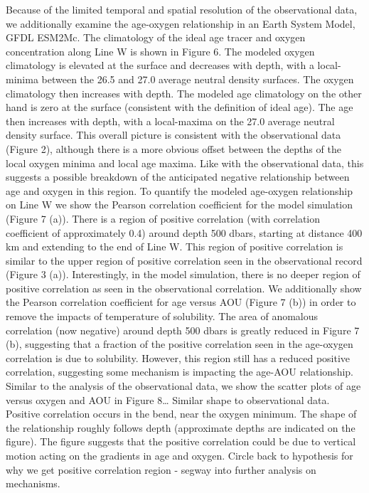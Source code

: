 Because of the limited temporal and spatial resolution of the observational data, we additionally examine the age-oxygen relationship in an Earth System Model, GFDL ESM2Mc. The climatology of the ideal age tracer and oxygen concentration along Line W is shown in Figure 6. The modeled oxygen climatology is elevated at the surface and decreases with depth, with a local-minima between the 26.5 and 27.0 average neutral density surfaces. The oxygen climatology then increases with depth. The modeled age climatology on the other hand is zero at the surface (consistent with the definition of ideal age). The age then increases with depth, with a local-maxima on the 27.0 average neutral density surface. This overall picture is consistent with the observational data (Figure 2), although there is a more obvious offset between the depths of the local oxygen minima and local age maxima. Like with the observational data, this suggests a possible breakdown of the anticipated negative relationship between age and oxygen in this region.
	To quantify the modeled age-oxygen relationship on Line W we show the Pearson correlation coefficient for the model simulation (Figure 7 (a)). There is a region of positive correlation (with correlation coefficient of approximately 0.4) around depth 500 dbars, starting at distance 400 km and extending to the end of Line W. This region of positive correlation is similar to the upper region of positive correlation seen in the observational record (Figure 3 (a)). Interestingly, in the model simulation, there is no deeper region of positive correlation as seen in the observational correlation. We additionally show the Pearson correlation coefficient for age versus AOU (Figure 7 (b)) in order to remove the impacts of temperature of solubility. The area of anomalous correlation (now negative) around depth 500 dbars is greatly reduced in Figure 7 (b), suggesting that a fraction of the positive correlation seen in the age-oxygen correlation is due to solubility. However, this region still has a reduced positive correlation, suggesting some mechanism is impacting the age-AOU relationship.
	Similar to the analysis of the observational data, we show the scatter plots of age versus oxygen and AOU in Figure 8… Similar shape to observational data.  Positive correlation occurs in the bend, near the oxygen minimum. The shape of the relationship roughly follows depth (approximate depths are indicated on the figure). The figure suggests that the positive correlation could be due to vertical motion acting on the gradients in age and oxygen.
	Circle back to hypothesis for why we get positive correlation region - segway into further analysis on mechanisms.

